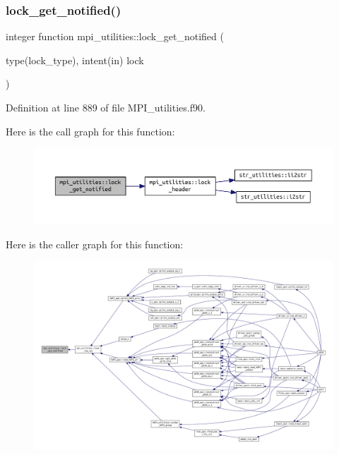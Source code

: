 \mbox{\label{namespacempi__utilities_a9ec02d2ade63716189369640f0da3c5f}} 
\subsubsection{\texorpdfstring{lock\+\_\+get\+\_\+notified()}{lock\_get\_notified()}}
{\footnotesize\ttfamily integer function mpi\+\_\+utilities\+::lock\+\_\+get\+\_\+notified (\begin{DoxyParamCaption}\item[{type(lock\+\_\+type), intent(in)}]{lock }\end{DoxyParamCaption})}



Definition at line 889 of file M\+P\+I\+\_\+utilities.\+f90.

Here is the call graph for this function\+:
\nopagebreak
\begin{figure}[H]
\begin{center}
\leavevmode
\includegraphics[width=350pt]{namespacempi__utilities_a9ec02d2ade63716189369640f0da3c5f_cgraph}
\end{center}
\end{figure}
Here is the caller graph for this function\+:
\nopagebreak
\begin{figure}[H]
\begin{center}
\leavevmode
\includegraphics[width=350pt]{namespacempi__utilities_a9ec02d2ade63716189369640f0da3c5f_icgraph}
\end{center}
\end{figure}
\mbox{\label{namespacempi__utilities_a4c5de9472574b63c69212948d8a3f4e1}} 
